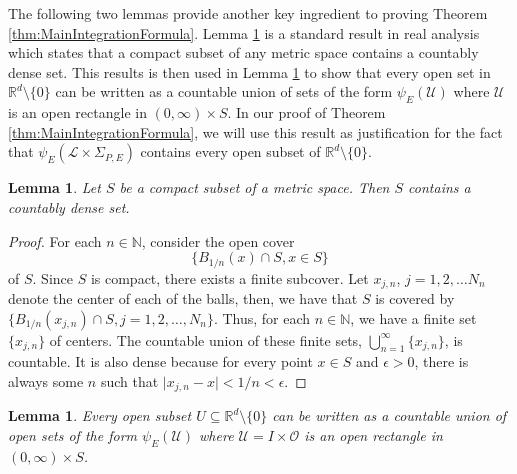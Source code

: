 \documentclass[11pt, letter]{book}
\newtheorem{lemma}[theorem]{Lemma}
\begin{document}
\noindent The following two lemmas provide another key ingredient to proving Theorem \ref{thm:MainIntegrationFormula}. Lemma \ref{lem:S_Dense} is a standard result in real analysis which states that a compact subset of any metric space contains a countably dense set. This results is then used in Lemma \ref{lem:OpenRectangle} to show that every open set in $\mathbb{R}^d\setminus \{ 0\}$ can be written as a countable union of sets of the form $\psi_E(\mathcal{U})$ where $\mathcal{U}$ is an open rectangle in $(0,\infty)\times S$. In our proof of Theorem \ref{thm:MainIntegrationFormula}, we will use this result as justification for the fact that $\psi_E(\mathcal{L}\times \Sigma_{P,E})$ contains every open subset of $\mathbb{R}^d\setminus \{0 \}$. 
\begin{framed}
\begin{lemma}\label{lem:S_Dense}
Let $S$ be a compact subset of a metric space. Then $S$ contains a countably dense set.
\end{lemma}
\end{framed}
\begin{proof}
For each $n\in\mathbb{N}$, consider the open cover
\begin{equation*}
\{B_{1/n}(x)\cap S, x\in S\}
\end{equation*}
of $S$. Since $S$ is compact, there exists a finite subcover. Let $x_{j,n}$, $j=1,2,\dots N_n$ denote the center of each of the balls, then, we have that $S$ is covered by $\{B_{1/n}(x_{j,n})\cap S,j=1,2,\dots, N_n\}$. Thus, for each $n\in \mathbb{N}$, we have a finite set $\{x_{j,n}\}$ of centers. The countable union of these finite sets, $\bigcup^\infty_{n=1} \{ x_{j,n}\}$, is countable. It is also dense because for every point $x\in S$ and $\epsilon >0$, there is always some $n$ such that $\vert x_{j,n} - x\vert < 1/n < \epsilon$.  
\end{proof}
\begin{framed}
\begin{lemma}\label{lem:OpenRectangle}
Every open subset $U\subseteq \mathbb{R}^d\setminus\{0\}$ can be written as a countable union of open sets of the form $\psi_E(\mathcal{U})$ where $\mathcal{U}=I\times\mathcal{O}$ is an open rectangle in $(0,\infty)\times S$.
\end{lemma}
\end{framed}
\end{document}
